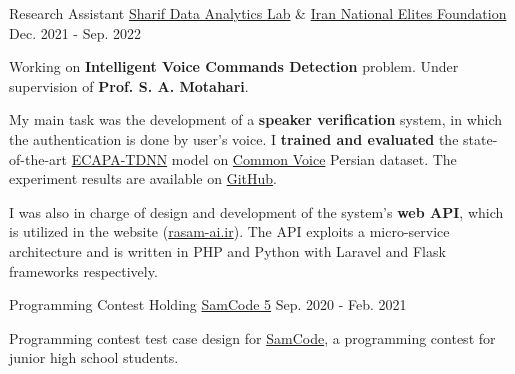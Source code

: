 

\begin{cventries}

  \cventry
    {Research Assistant} %
    {\href{https://www.sharif.edu/}{Sharif Data Analytics Lab} \& \href{https://en.bmn.ir/}{Iran National Elites Foundation}} %
    {} %
    {Dec. 2021 - Sep. 2022} %
    {
      \begin{cvitems} %
        \item {Working on \textbf{Intelligent Voice Commands Detection} problem. Under supervision of \textbf{Prof. S. A. Motahari}.}
        \item {My main task was the development of a \textbf{speaker verification} system, in which the authentication is done by user's voice. I \textbf{trained and evaluated} the state-of-the-art \href{https://arxiv.org/abs/2005.07143}{ECAPA-TDNN} model on \href{https://commonvoice.mozilla.org}{Common Voice} Persian dataset. The experiment results are available on \href{https://github.com/Sharif-DAL-INEF-1400/Verification-and-Identification-Speechbrain}{GitHub}.}
        \item{I was also in charge of design and development of the system's \textbf{web API}, which is utilized in the website (\href{https://rasam-ai.ir/}{rasam-ai.ir}). The API exploits a micro-service architecture and is written in PHP and Python with Laravel and Flask frameworks respectively.}
      \end{cvitems}
    }

  \cventry
    {Programming Contest Holding} %
    {\href{https://samcode.allamehelli3.ir/staff.html}{SamCode 5}} %
    {} %
    {Sep. 2020 - Feb. 2021} %
    {
      \begin{cvitems} %
        \item {Programming contest test case design for {\href{https://samcode.allamehelli3.ir/}{SamCode}}, a programming contest for junior high school students.}
      \end{cvitems}
    }

\end{cventries}

